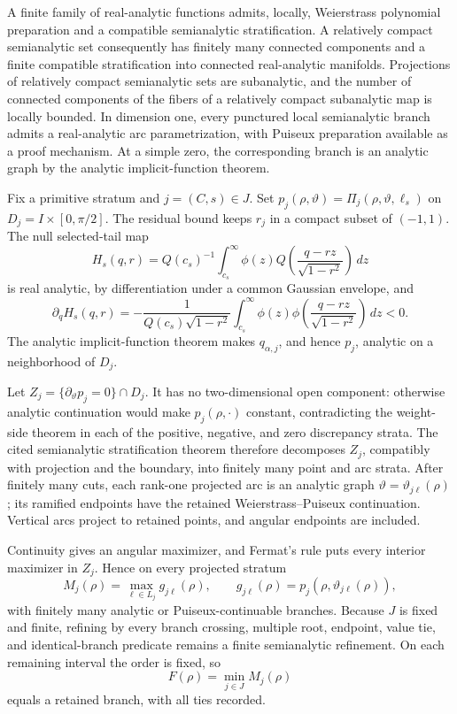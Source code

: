 A finite family of real-analytic functions admits, locally, Weierstrass polynomial preparation and a compatible semianalytic stratification. A relatively compact semianalytic set consequently has finitely many connected components and a finite compatible stratification into connected real-analytic manifolds. Projections of relatively compact semianalytic sets are subanalytic, and the number of connected components of the fibers of a relatively compact subanalytic map is locally bounded. In dimension one, every punctured local semianalytic branch admits a real-analytic arc parametrization, with Puiseux preparation available as a proof mechanism. At a simple zero, the corresponding branch is an analytic graph by the analytic implicit-function theorem.

Fix a primitive stratum and \(j=(C,s)\in J\).  Set \(p_j(\rho,\vartheta)=\Pi_j(\rho,\vartheta,\ell_s)\) on \(D_j=I\times[0,\pi/2]\).  The residual bound keeps \(r_j\) in a compact subset of \((-1,1)\).  The null selected-tail map
\[
H_s(q,r)=Q(c_s)^{-1}\int_{c_s}^{\infty}
\phi(z)Q\!\left(\frac{q-rz}{\sqrt{1-r^2}}\right)\,dz
\]
is real analytic, by differentiation under a common Gaussian envelope, and
\[
\partial_qH_s(q,r)=-\frac{1}{Q(c_s)\sqrt{1-r^2}}
\int_{c_s}^{\infty}\phi(z)
\phi\!\left(\frac{q-rz}{\sqrt{1-r^2}}\right)\,dz<0.
\]
The analytic implicit-function theorem makes \(q_{\alpha,j}\), and hence \(p_j\), analytic on a neighborhood of \(D_j\).

Let \(Z_j=\{\partial_\vartheta p_j=0\}\cap D_j\).  It has no two-dimensional open component: otherwise analytic continuation would make \(p_j(\rho,\cdot)\) constant, contradicting the weight-side theorem in each of the positive, negative, and zero discrepancy strata.  The cited semianalytic stratification theorem therefore decomposes \(Z_j\), compatibly with projection and the boundary, into finitely many point and arc strata.  After finitely many cuts, each rank-one projected arc is an analytic graph \(\vartheta=\vartheta_{j\ell}(\rho)\); its ramified endpoints have the retained Weierstrass--Puiseux continuation.  Vertical arcs project to retained points, and angular endpoints are included.

Continuity gives an angular maximizer, and Fermat's rule puts every interior maximizer in \(Z_j\).  Hence on every projected stratum
\[
M_j(\rho)=\max_{\ell\in L_j}g_{j\ell}(\rho),
\qquad
g_{j\ell}(\rho)=p_j(\rho,\vartheta_{j\ell}(\rho)),
\]
with finitely many analytic or Puiseux-continuable branches.  Because \(J\) is fixed and finite, refining by every branch crossing, multiple root, endpoint, value tie, and identical-branch predicate remains a finite semianalytic refinement.  On each remaining interval the order is fixed, so
\[
F(\rho)=\min_{j\in J}M_j(\rho)
\]
equals a retained branch, with all ties recorded.

